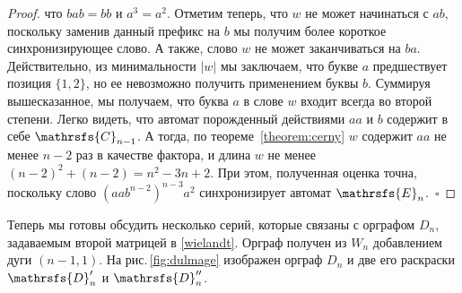 \documentclass[11pt]{article}
\begin{document}
\begin{proof}
что $bab = bb$ и $a^3 = a^2$. Отметим теперь, что 
$w$ не может начинаться с $ab$, поскольку заменив данный префикс на $b$ мы получим более короткое
синхронизирующее слово. А также, слово $w$ не может заканчиваться на $ba$. Действительно, из минимальности
$|w|$ мы заключаем, что букве $a$ предшествует позиция $\{1,2\}$, но ее невозможно получить
применением буквы $b$. Суммируя вышесказанное, мы получаем, что	буква $a$ в слове $w$ входит всегда
во второй степени. Легко видеть, что автомат порожденный действиями $aa$ и $b$ содержит в себе $\mathrsfs{C}_{n - 1}$.
А тогда, по теореме~\ref{theorem:cerny} $w$ содержит $aa$ не менее $n - 2$ раз в качестве фактора, и
длина $w$ не менее $(n - 2)^2 + (n - 2) = n^2 - 3n + 2$.
При этом, полученная оценка точна, поскольку слово $(aab^{n - 2})^{n - 3}a^2$ синхронизирует автомат $\mathrsfs{E}_n$.~$\square$

\end{proof}


Теперь мы готовы обсудить несколько серий, которые связаны с орграфом $D_n$,
задаваемым второй матрицей в \eqref{wielandt}. Орграф получен из $W_n$
добавлением дуги $(n-1,1)$. На рис.\,\ref{fig:dulmage} изображен орграф $D_n$
и две его раскраски $\mathrsfs{D}'_n$ и $\mathrsfs{D}''_n$.


\end{document}
